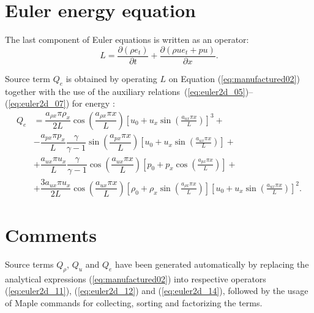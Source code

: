 \documentclass[10pt]{article}
\newcommand{\Diff}[2] {\dfrac{\partial( #1)}{\partial #2}}
\begin{document}
\section{Euler energy equation}


The last component of Euler equations is written as an operator:
\begin{equation}
 \label{eq:euler2d_14}
L=\Diff{\rho e_t}{t} + \Diff{\rho ue_t +pu}{x} .
\end{equation}


Source term $Q_e$ is obtained by operating $L$ on Equation  (\ref{eq:manufactured02}) together with the use of the  auxiliary relations~(\ref{eq:euler2d_05})--(\ref{eq:euler2d_07}) for energy :
  \begin{equation}\label{eq:source_e}
 \begin{split}
\displaystyle
Q_e &= \dfrac{a_{\rho x} \pi \rho_x }{2L}  \cos\left( \dfrac{a_{\rho x} \pi x}{L} \right) \left[ u_{0}+u_{x} \sin\left(\frac{a_{u  x} \pi x}{L}\right) \right]^3 +\\
&-\dfrac{a_{px} \pi p_x }{L}\dfrac{\gamma}{\gamma-1}\sin\left( \dfrac{a_{px} \pi x}{L} \right) \left[ u_{0}+u_{x} \sin\left(\frac{a_{u  x} \pi x}{L}\right) \right] +\\
&+\dfrac{a_{ux} \pi u_x }{L}\dfrac{\gamma}{\gamma-1}\cos\left( \dfrac{a_{ux} \pi x}{L} \right) \left[ p_{0}+p_{x} \cos\left(\frac{a_{p  x} \pi x}{L}\right)\right] +\\ 
&+ \dfrac{3a_{ux} \pi u_x }{2L}  \cos\left( \dfrac{a_{ux} \pi x}{L} \right)\left[  \rho_{0}+ \rho_{x} \sin\left(\frac{a_{ \rho  x} \pi x}{L}\right) \right] \left[ u_{0}+u_{x} \sin\left(\frac{a_{u  x} \pi x}{L}\right) \right]^2.
 \end{split}
 \end{equation}

 

\section{Comments}

Source terms $Q_{\rho}$, $Q_u$ and $Q_e$ have been generated automatically by replacing the analytical expressions (\ref{eq:manufactured02}) into  respective operators  (\ref{eq:euler2d_11}), (\ref{eq:euler2d_12}) and (\ref{eq:euler2d_14}), followed by the usage of Maple commands for collecting, sorting and factorizing the terms. 
 
\end{document}
